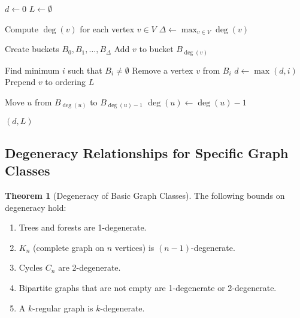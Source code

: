 \documentclass{article}
\theoremstyle{definition}
\newtheorem{theorem}{Theorem}
\begin{document}
\pagebreak
\newpage
\clearpage

\begin{algorithm}
\caption{Efficient Implementation of Matula-Beck Algorithm}
\label{alg:efficient-matula-beck}
\begin{algorithmic}[1]
        \State $d \gets 0$ 
        \State $L \gets \emptyset$ 
        
        \State Compute $\deg(v)$ for each vertex $v \in V$
        \State $\Delta \gets \max_{v \in V} \deg(v)$ 
        
        \State Create buckets $B_0, B_1, \ldots, B_{\Delta}$
            \State Add $v$ to bucket $B_{\deg(v)}$
        \EndFor
        
            \State Find minimum $i$ such that $B_i \neq \emptyset$
            \State Remove a vertex $v$ from $B_i$
            \State $d \gets \max(d, i)$ 
            \State Prepend $v$ to ordering $L$
            
                \State Move $u$ from $B_{\deg(u)}$ to $B_{\deg(u)-1}$
                \State $\deg(u) \gets \deg(u) - 1$ 
            \EndFor
        \EndWhile
        
        \State \Return $(d, L)$ 
    \EndProcedure
\end{algorithmic}
\end{algorithm}

\subsection{Degeneracy Relationships for Specific Graph Classes}

\begin{theorem}[Degeneracy of Basic Graph Classes]
The following bounds on degeneracy hold:
\begin{enumerate}
    \item Trees and forests are 1-degenerate.
    \item $K_n$ (complete graph on $n$ vertices) is $(n-1)$-degenerate.
    \item Cycles $C_n$ are 2-degenerate.
    \item Bipartite graphs that are not empty are 1-degenerate or 2-degenerate.
    \item A $k$-regular graph is $k$-degenerate.
\end{enumerate}
\end{theorem}
\end{document}
